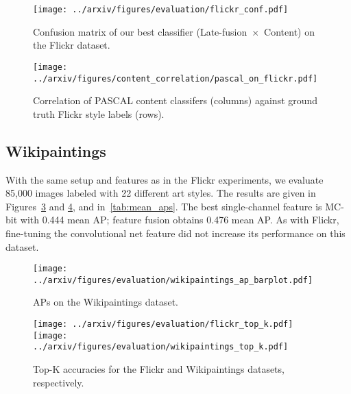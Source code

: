 \begin{figure}[h]
\centering
\texttt{[image: ../arxiv/figures/evaluation/flickr\_conf.pdf]}
\caption{
    Confusion matrix of our best classifier (\mbox{Late-fusion $\times$ Content}) on the Flickr dataset.
}
\label{fig:flickr_confusion}
\end{figure}

\begin{figure}[h]
\centering
\texttt{[image: ../arxiv/figures/content\_correlation/pascal\_on\_flickr.pdf]}
\caption{
    Correlation of PASCAL content classifers (columns) against ground truth Flickr style labels (rows).
}
\label{fig:content_correlation}
\end{figure}

\subsection{Wikipaintings}

With the same setup and features as in the Flickr experiments, we evaluate 85,000 images labeled with 22 different art styles.
The results are given in Figures~\ref{fig:wikipaintings_style_results} and \ref{fig:top_k}, and in~\autoref{tab:mean_aps}.
The best single-channel feature is MC-bit with 0.444 mean AP; feature fusion obtains 0.476 mean AP.
As with Flickr, fine-tuning the convolutional net feature did not increase its performance on this dataset.

\begin{figure}
\centering
\texttt{[image: ../arxiv/figures/evaluation/wikipaintings\_ap\_barplot.pdf]}
\caption{APs on the Wikipaintings dataset.}
\label{fig:wikipaintings_style_results}
\end{figure}

\begin{figure}
\centering
\texttt{[image: ../arxiv/figures/evaluation/flickr\_top\_k.pdf]}
\texttt{[image: ../arxiv/figures/evaluation/wikipaintings\_top\_k.pdf]}
\caption{Top-K accuracies for the Flickr and Wikipaintings datasets, respectively. }
\label{fig:top_k}
\end{figure}


